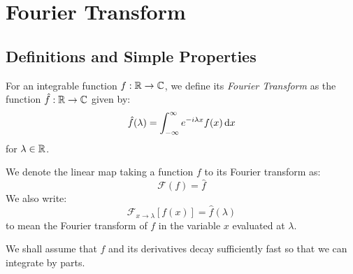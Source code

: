 \documentclass[../main.tex]{subfiles}
\begin{document}
\chapter{Fourier Transform} \label{FTSec}
\section{Definitions and Simple Properties}
\begin{definition}
  For an integrable function $f: \mathbb{R} \to \mathbb{C}$, we define its \textit{Fourier Transform} as the function $\hat{f}: \mathbb{R} \to \mathbb{C}$ given by:
  \[
    \hat{f}(\lambda) = \int_{-\infty}^{\infty} e^{-i\lambda x}f(x) \d{x}
  \]
  for $\lambda \in \mathbb{R}$.
\end{definition}
\begin{remark}[Notation]
  We denote the linear map taking a function $f$ to its Fourier transform as:
  \[
    \mathcal{F}(f) = \hat{f}
  \]
  We also write:
  \[
    \mathcal{F}_{x \to \lambda}[f(x)] = \hat{f}(\lambda)
  \]
  to mean the Fourier transform of $f$ in the variable $x$ evaluated at $\lambda$.
\end{remark}
We shall assume that $f$ and its derivatives decay sufficiently fast so that we can integrate by parts.
\end{document}
